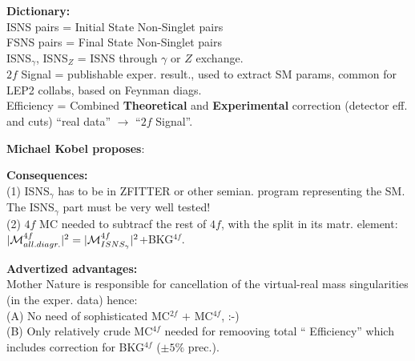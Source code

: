 \documentclass[dvips,portrait]{seminar}             %
\begin{document}
\begin{slide*}                                                %

{\bf Dictionary:}\\
{ ISNS pairs} = Initial State Non-Singlet pairs\\
{ FSNS pairs} = Final State Non-Singlet pairs\\
{ ISNS$_{\gamma}$, ISNS$_{Z}$} = ISNS through $\gamma$ or $Z$ exchange.\\
{ $2f$ Signal} = publishable exper. result., 
used to extract SM params, common for LEP2 collabs, 
based on Feynman diags.\\
{ Efficiency} = 
Combined {\bf Theoretical} and {\bf Experimental} correction (detector eff. and cuts)
``real data'' $\to$ ``$2f$ Signal''.


{ {\bf Michael Kobel proposes}: 
}

{\bf Consequences:}\\
{ 
(1) ISNS$_{\gamma}$ has to be in ZFITTER or other
semian. program representing the SM.
The ISNS$_{\gamma}$ part must be very well tested!\\
(2) $4f$ MC needed to subtracf the rest of $4f$, 
with the split in its matr. element:
$|{\cal M}^{4f}_{all.diagr.}|^2 = |{\cal M}^{4f}_{ISNS_{\gamma}}|^2$+BKG$^{4f}$.}

{\bf Advertized advantages:}\\
Mother Nature is responsible for cancellation of 
the virtual-real mass singularities (in the exper. data)
hence:\\
(A) No need of sophisticated MC$^{2f}$ $+$ MC$^{4f}$, :-)\\
(B) Only relatively crude MC$^{4f}$ needed for remooving total
    ``{ Efficiency}'' which includes correction for BKG$^{4f}$
    ($\pm5\%$ prec.).
\vfill
\end{slide*}   %
\end{document}
